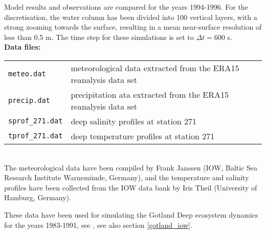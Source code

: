 Model results and observations are compared for the years 1994-1996.
For the discretisation, the water column has been
divided into 100 vertical layers, with a strong zooming towards the surface,
resulting in a mean near-surface resolution of less than 0.5 m.
The time step for these simulations is set to $\Delta t=600$ s.
\\

{\bf Data files:}

\begin{tabular}{ll}
{\tt meteo.dat} &  meteorological data extracted from the ERA15 reanalysis 
                   data set  \\
{\tt precip.dat} &  precipitation 
ata extracted from the ERA15 reanalysis 
                   data set  \\
{\tt sprof\_271.dat} & deep salinity profiles at station 271\\ 
{\tt tprof\_271.dat} &  deep temperature profiles at station 271\\
\end{tabular}
\\

The meteorological data have been compiled by Frank Janssen 
(IOW, Baltic Sea Research Institute Warnem\"unde, Germany), and
the temperature and salinity profiles have been collected from the IOW
data bank by Iris Theil (University of Hamburg, Germany).

These data have been used for simulating the Gotland Deep ecosystem dynamics
for the years 1983-1991, see \cite{Burchardetal05},
see also section \ref{gotland_iow}.

